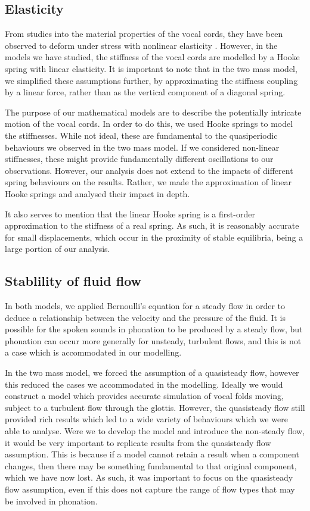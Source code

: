 \documentclass{report}
\begin{document}

\subsection{Elasticity}

From studies into the material properties of the vocal cords,
they have been observed to deform under stress with nonlinear elasticity \cite{alipour_2012}.
However, in the models we have studied,
the stiffness of the vocal cords are modelled by a Hooke spring with linear elasticity.
It is important to note that in the two mass model,
we simplified these assumptions further,
by approximating the stiffness coupling by a linear force,
rather than as the vertical component of a diagonal spring.

The purpose of our mathematical models are to describe the potentially intricate motion of the vocal cords.
In order to do this,
we used Hooke springs to model the stiffnesses.
While not ideal, these are fundamental to the quasiperiodic behaviours we observed in the two mass model.
If we considered non-linear stiffnesses,
these might provide fundamentally different oscillations to our observations.
However, our analysis does not extend to the impacts of different spring behaviours on the results.
Rather, we made the approximation of linear Hooke springs and analysed their impact in depth.

It also serves to mention that the linear Hooke spring is a first-order approximation to the stiffness of a real spring.
As such, it is reasonably accurate for small displacements,
which occur in the proximity of stable equilibria,
being a large portion of our analysis.

\subsection{Stablility of fluid flow}

In both models,
we applied Bernoulli's equation for a steady flow in order to deduce a relationship between the velocity and the pressure of the fluid.
It is possible for the spoken sounds in phonation to be produced by a steady flow,
but phonation can occur more generally for unsteady, turbulent flows,
and this is not a case which is accommodated in our modelling.

In the two mass model,
we forced the assumption of a quasisteady flow,
however this reduced the cases we accommodated in the modelling.
Ideally we would construct a model which provides accurate simulation of vocal folds moving, subject to a turbulent flow through the glottis.
However, the quasisteady flow still provided rich results which led to a wide variety of behaviours which we were able to analyse.
Were we to develop the model and introduce the non-steady flow,
it would be very important to replicate results from the quasisteady flow assumption.
This is because if a model cannot retain a result when a component changes,
then there may be something fundamental to that original component,
which we have now lost.
As such,
it was important to focus on the quasisteady flow assumption,
even if this does not capture the range of flow types that may be involved in phonation.
\end{document}
